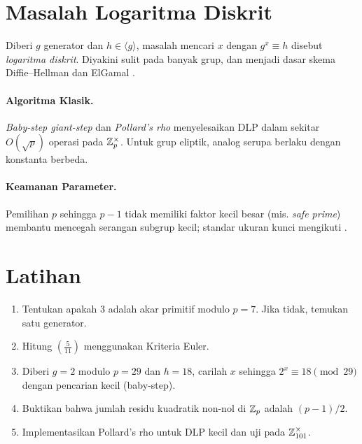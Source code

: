 \documentclass[../main.tex]{subfiles}
\begin{document}
\section{Masalah Logaritma Diskrit}
Diberi \(g\) generator dan \(h\in\langle g\rangle\), masalah mencari \(x\) dengan \(g^x\equiv h\) disebut \emph{logaritma diskrit}. Diyakini sulit pada banyak grup, dan menjadi dasar skema Diffie--Hellman dan ElGamal \citep{diffiehellman,hoffstein}.

\paragraph{Algoritma Klasik.} \emph{Baby-step giant-step} dan \emph{Pollard's rho} menyelesaikan DLP dalam sekitar \(O(\sqrt{p})\) operasi pada \(\mathbb{Z}_p^\times\). Untuk grup eliptik, analog serupa berlaku dengan konstanta berbeda.

\paragraph{Keamanan Parameter.} Pemilihan \(p\) sehingga \(p-1\) tidak memiliki faktor kecil besar (mis. \emph{safe prime}) membantu mencegah serangan subgrup kecil; standar ukuran kunci mengikuti \citep{nist_sp_800_131a}.

\section{Latihan}
\begin{enumerate}
  \item Tentukan apakah \(3\) adalah akar primitif modulo \(p=7\). Jika tidak, temukan satu generator.
  \item Hitung \(\left(\tfrac{5}{11}\right)\) menggunakan Kriteria Euler.
  \item Diberi \(g=2\) modulo \(p=29\) dan \(h=18\), carilah \(x\) sehingga \(2^x\equiv 18\pmod{29}\) dengan pencarian kecil (baby-step).
  \item Buktikan bahwa jumlah residu kuadratik non-nol di \(\mathbb{Z}_p\) adalah \((p-1)/2\).
  \item Implementasikan Pollard's rho untuk DLP kecil dan uji pada \(\mathbb{Z}_{101}^\times\).
\end{enumerate}
\end{document}
